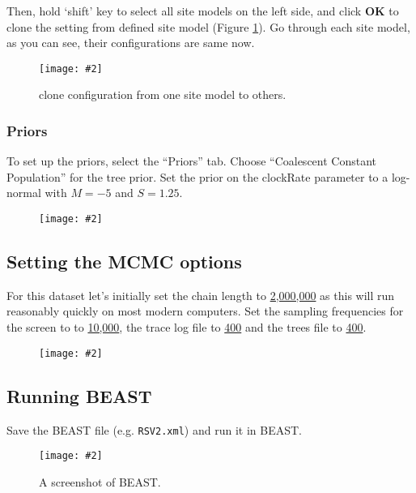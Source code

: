 \documentclass[12pt]{article}
\newcommand{\includeimage}[2][]{%
\texttt{[image: \#2]}
}
\newcommand{\chainLength}{{2,000,000}}
\newcommand{\logEvery}{{400}}
\newcommand{\screenEvery}{{10,000}}
\begin{document}
Then, hold `shift' key to select all site models on the left side, and click \textbf{OK} to clone the setting from defined site model (Figure \ref{fig:cloneFrom}). Go through each site model, as you can see, their configurations are same now. 

\begin{figure}
\centering	
\includeimage[width=0.9\textwidth]{figures/cloneFrom}
\caption{clone configuration from one site model to others.}
\label{fig:cloneFrom}
\end{figure}


\subsubsection{Priors }

To set up the priors, select the ``Priors'' tab.
Choose ``Coalescent Constant Population'' for the tree prior. Set the prior on the clockRate parameter to a log-normal with $M=-5$ and $S=1.25$. 

\begin{figure}
\centering	
\includeimage[width=0.8\textwidth]{figures/BEAUti_priors}
\label{fig:BEAUti_priors}
\end{figure}


\subsection{Setting the MCMC options}

For this dataset let's initially set the chain length to \underline{\chainLength{}} as this will run 
reasonably quickly on most modern computers. Set the sampling frequencies for the screen to
to \underline{\screenEvery{}}, the trace log file to \underline{\logEvery{}} and the trees file to \underline{\logEvery{}}.

\begin{figure}
\centering	
\includeimage[width=0.8\textwidth]{figures/BEAUti_mcmc}
\label{fig:BEAUti_mcmc}
\end{figure}


\subsection*{Running BEAST}

Save the BEAST file (e.g. \texttt{RSV2.xml}) and run it in BEAST.

\begin{figure}
\centering	
\includeimage[width=0.7\textwidth]{figures/BEAST}
\caption{A screenshot of BEAST.}
\label{fig:BEAST}
\end{figure}
\end{document}

